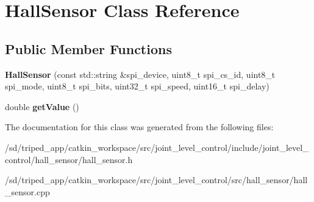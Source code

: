 \hypertarget{classHallSensor}{}\section{Hall\+Sensor Class Reference}
\label{classHallSensor}
\subsection*{Public Member Functions}
\begin{DoxyCompactItemize}
\item 
\mbox{\label{classHallSensor_aa56bea857cdc3858137a6ebf60040ba4}} 
{\bfseries Hall\+Sensor} (const std\+::string \&spi\+\_\+device, uint8\+\_\+t spi\+\_\+cs\+\_\+id, uint8\+\_\+t spi\+\_\+mode, uint8\+\_\+t spi\+\_\+bits, uint32\+\_\+t spi\+\_\+speed, uint16\+\_\+t spi\+\_\+delay)
\item 
\mbox{\label{classHallSensor_a5eea1969e798bc786c5fa165aeb47c77}} 
double {\bfseries get\+Value} ()
\end{DoxyCompactItemize}


The documentation for this class was generated from the following files\+:\begin{DoxyCompactItemize}
\item 
/sd/triped\+\_\+app/catkin\+\_\+workspace/src/joint\+\_\+level\+\_\+control/include/joint\+\_\+level\+\_\+control/hall\+\_\+sensor/hall\+\_\+sensor.\+h\item 
/sd/triped\+\_\+app/catkin\+\_\+workspace/src/joint\+\_\+level\+\_\+control/src/hall\+\_\+sensor/hall\+\_\+sensor.\+cpp\end{DoxyCompactItemize}
